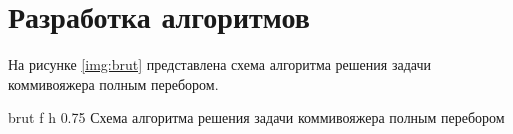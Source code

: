 \section{Разработка алгоритмов}

На рисунке \ref{img:brut} представлена схема алгоритма решения задачи коммивояжера полным перебором. 

\clearpage

{brut} %
{f} %
{h} %
{0.75\textwidth} %
{Схема алгоритма решения задачи коммивояжера полным перебором} %
